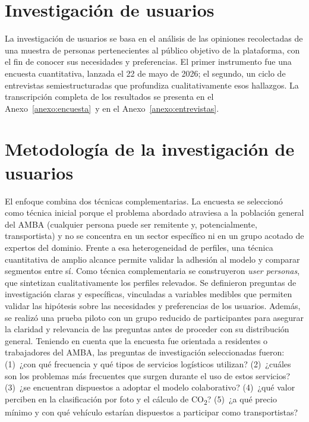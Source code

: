 \section{Investigación de usuarios}

La investigación de usuarios se basa en el análisis de las opiniones recolectadas de una muestra de personas pertenecientes al público objetivo de la plataforma, con el fin de conocer sus necesidades y preferencias. El {\color{nuevo}primer instrumento} fue una encuesta cuantitativa, lanzada el 22 de mayo de 2026{\color{nuevo}; el segundo, un ciclo de entrevistas semiestructuradas que profundiza cualitativamente esos hallazgos}. La transcripción completa de los resultados se presenta en el Anexo~\ref{anexo:encuesta}{\color{nuevo}\ y en el Anexo~\ref{anexo:entrevistas}}.
\section{Metodología de la investigación de usuarios}

El enfoque combina dos técnicas complementarias.  La encuesta se seleccionó como técnica inicial porque el problema abordado atraviesa a la población general del AMBA (cualquier persona puede ser remitente y, potencialmente, transportista) y no se concentra en un sector específico ni en un grupo acotado de expertos del dominio. Frente a esa heterogeneidad de perfiles, una técnica cuantitativa de amplio alcance permite validar la adhesión al modelo y comparar segmentos entre sí.  Como técnica complementaria se construyeron \emph{user personas}, que sintetizan cualitativamente los perfiles relevados. Se definieron preguntas de investigación claras y específicas, vinculadas a variables medibles que permiten validar las hipótesis sobre las necesidades y preferencias de los usuarios. Además, se realizó una prueba piloto con un grupo reducido de participantes para asegurar la claridad y relevancia de las preguntas antes de proceder con su distribución general.
Teniendo en cuenta que la encuesta fue orientada a residentes o trabajadores del AMBA, las preguntas de investigación seleccionadas fueron: (1)~¿con qué frecuencia y qué tipos de servicios logísticos utilizan? (2)~¿cuáles son los problemas más frecuentes que surgen durante el uso de estos servicios? (3)~¿se encuentran dispuestos a adoptar el modelo colaborativo? (4)~¿qué valor perciben en la clasificación por foto y el cálculo de CO\textsubscript{2}? (5)~¿a qué precio mínimo y con qué vehículo estarían dispuestos a participar como transportistas?

